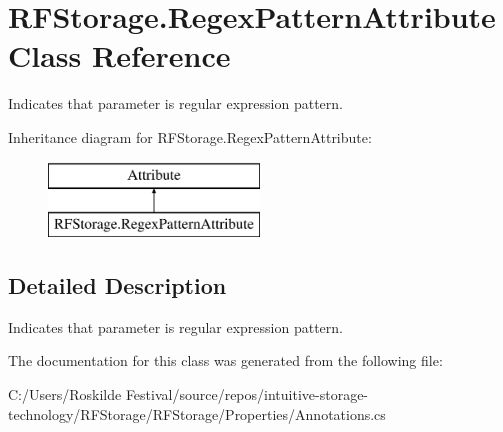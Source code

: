\section{R\+F\+Storage.\+Regex\+Pattern\+Attribute Class Reference}
\label{class_r_f_storage_1_1_regex_pattern_attribute}


Indicates that parameter is regular expression pattern.  


Inheritance diagram for R\+F\+Storage.\+Regex\+Pattern\+Attribute\+:\begin{figure}[H]
\begin{center}
\leavevmode
\includegraphics[height=2.000000cm]{class_r_f_storage_1_1_regex_pattern_attribute}
\end{center}
\end{figure}


\subsection{Detailed Description}
Indicates that parameter is regular expression pattern. 



The documentation for this class was generated from the following file\+:\begin{DoxyCompactItemize}
\item 
C\+:/\+Users/\+Roskilde Festival/source/repos/intuitive-\/storage-\/technology/\+R\+F\+Storage/\+R\+F\+Storage/\+Properties/Annotations.\+cs\end{DoxyCompactItemize}
